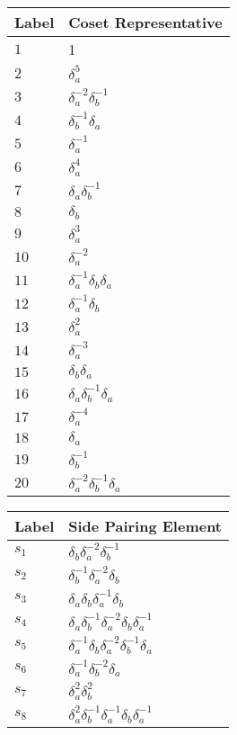 \documentclass{article}
\begin{document}

\begin{center}
\begin{tabular}{ll}
\toprule
Label & Coset Representative\\
\midrule
$1$ & 1 \\
$2$ & $\delta_a^{5}$ \\
$3$ & $\delta_a^{-2}\delta_b^{-1}$ \\
$4$ & $\delta_b^{-1}\delta_a^{}$ \\
$5$ & $\delta_a^{-1}$ \\
$6$ & $\delta_a^{4}$ \\
$7$ & $\delta_a^{}\delta_b^{-1}$ \\
$8$ & $\delta_b^{}$ \\
$9$ & $\delta_a^{3}$ \\
$10$ & $\delta_a^{-2}$ \\
$11$ & $\delta_a^{-1}\delta_b^{}\delta_a^{}$ \\
$12$ & $\delta_a^{-1}\delta_b^{}$ \\
$13$ & $\delta_a^{2}$ \\
$14$ & $\delta_a^{-3}$ \\
$15$ & $\delta_b^{}\delta_a^{}$ \\
$16$ & $\delta_a^{}\delta_b^{-1}\delta_a^{}$ \\
$17$ & $\delta_a^{-4}$ \\
$18$ & $\delta_a^{}$ \\
$19$ & $\delta_b^{-1}$ \\
$20$ & $\delta_a^{-2}\delta_b^{-1}\delta_a^{}$ \\
\bottomrule
\end{tabular}
\hfill
\begin{tabular}{ll}
\toprule
Label & Side Pairing Element\\
\midrule
$s_{1}$ & $\delta_b^{}\delta_a^{-2}\delta_b^{-1}$ \\
$s_{2}$ & $\delta_b^{-1}\delta_a^{-2}\delta_b^{}$ \\
$s_{3}$ & $\delta_a^{}\delta_b^{}\delta_a^{-1}\delta_b^{}$ \\
$s_{4}$ & $\delta_a^{}\delta_b^{-1}\delta_a^{-2}\delta_b^{}\delta_a^{-1}$ \\
$s_{5}$ & $\delta_a^{-1}\delta_b^{}\delta_a^{-2}\delta_b^{-1}\delta_a^{}$ \\
$s_{6}$ & $\delta_a^{-1}\delta_b^{-2}\delta_a^{}$ \\
$s_{7}$ & $\delta_a^{2}\delta_b^{2}$ \\
$s_{8}$ & $\delta_a^{2}\delta_b^{-1}\delta_a^{-1}\delta_b^{}\delta_a^{-1}$ \\

\end{tabular}
\end{center}
\end{document}
